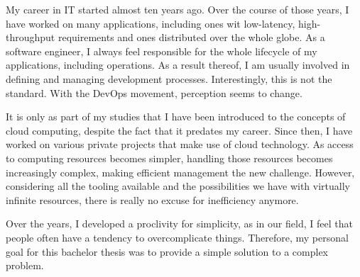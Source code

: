 \documentclass[../main.tex]{subfiles}
\begin{document}
    My career in IT started almost ten years ago.
    Over the course of those years, I have worked on many applications, including ones wit low-latency, high-throughput requirements and ones distributed over the whole globe.
    As a software engineer, I always feel responsible for the whole lifecycle of my applications, including operations.
    As a result thereof, I am usually involved in defining and managing development processes.
    Interestingly, this is not the standard.
    With the DevOps movement, perception seems to change.

    It is only as part of my studies that I have been introduced to the concepts of cloud computing, despite the fact that it predates my career.
    Since then, I have worked on various private projects that make use of cloud technology.
    As access to computing resources becomes simpler, handling those resources becomes increasingly complex, making efficient management the new challenge.
    However, considering all the tooling available and the possibilities we have with virtually infinite resources, there is really no excuse for inefficiency anymore.

    Over the years, I developed a proclivity for simplicity, as in our field, I feel that people often have a tendency to overcomplicate things.
    Therefore, my personal goal for this bachelor thesis was to provide a simple solution to a complex problem.
\end{document}
